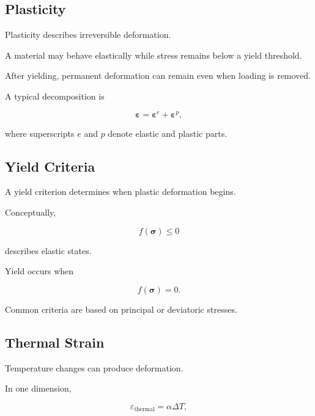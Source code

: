 \subsection{Plasticity}
\label{subsec:continuum-plasticity}

Plasticity describes irreversible deformation.

A material may behave elastically while stress remains below a yield
threshold.

After yielding, permanent deformation can remain even when loading is
removed.

A typical decomposition is

\[
\boxed{
\boldsymbol{\varepsilon}
=
\boldsymbol{\varepsilon}^{e}
+
\boldsymbol{\varepsilon}^{p},
}
\]

where superscripts \(e\) and \(p\) denote elastic and plastic parts.

\subsection{Yield Criteria}
\label{subsec:yield-criteria}

A yield criterion determines when plastic deformation begins.

Conceptually,

\[
\boxed{
f(\boldsymbol{\sigma})
\leq0
}
\]

describes elastic states.

Yield occurs when

\[
\boxed{
f(\boldsymbol{\sigma})=0.
}
\]

Common criteria are based on principal or deviatoric stresses.

\subsection{Thermal Strain}
\label{subsec:thermal-strain}

Temperature changes can produce deformation.

In one dimension,

\[
\boxed{
\varepsilon_{\text{thermal}}
=
\alpha
\Delta T,
}
\]

